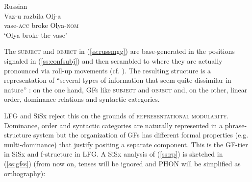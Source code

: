 \documentclass[output=paper,hidelinks]{langscibook}
\begin{document}
\ea\label{ss:russ}Russian\\
\gll    Vaz-u razbila Olj-a \citep[30]{kallestinova2007aspects}\\  
     vase-\textsc{acc} broke Olya-\textsc{nom}\\ 
\glt `Olya broke the vase' 
\z

\begin{exe}
 \label{ss:russmgg}
\end{exe}

The \textsc{subject} and \textsc{object} in (\ref{ss:russmgg}) are  base-generated in the positions signaled in (\ref{ss:confsubj}) and then scrambled to where they are actually pronounced via roll-up movements (cf. \citealt{bailyn2003purely}). The resulting structure is a representation of ``several types of information that seem quite dissimilar in nature'' \citep[137]{kaplzaen89}: on the one hand, GFs like \textsc{subject} and \textsc{object} and, on the other, linear order, dominance relations and syntactic categories. %

LFG and SiSx reject this on the grounds of \textsc{representational modularity}. Dominance, order and syntactic categories are naturally represented in a phrase-structure system but the organization of GFs has different formal properties (e.g. multi-dominance) that justify positing a separate component. This is the GF-tier in SiSx and f-structure in LFG. A SiSx analysis of (\ref{ss:rp}) is sketched in (\ref{ss:gfss}) (from now on, tenses will be ignored and PHON will be simplified as orthography):

\end{document}
